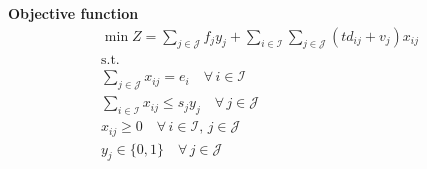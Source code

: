 \documentclass[10pt]{article}
\begin{document}
\textbf{Objective function}
\begin{gather*}
    \min Z = \sum_{j\in \mathcal{J}}f_jy_j + \sum_{i\in \mathcal{I}}\sum_{j\in \mathcal{J}}\left(td_{ij} + v_j\right)x_{ij}\\
    \text{s.t.}\\
    \sum_{j\in \mathcal{J}}x_{ij} = e_i\quad\forall\, i\in \mathcal{I}\\
    \sum_{i\in \mathcal{I}}x_{ij}\le s_jy_j\quad\forall\, j \in \mathcal{J}\\
    x_{ij}\ge 0\quad\forall\, i\in \mathcal{I},\, j\in \mathcal{J}\\
    y_j\in \{0, 1\}\quad\forall\, j\in \mathcal{J}
\end{gather*}
\end{document}
